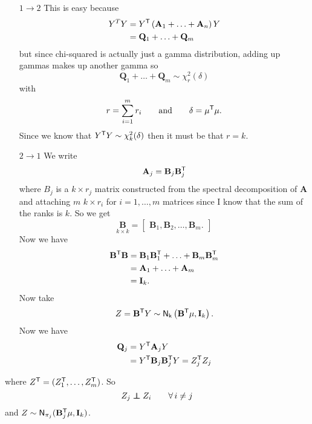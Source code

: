 \documentclass[12pt]{report}
\begin{document}
\begin{fancyproof}
	\begin{enumerate}
		\item[$1\to2$] This is easy because
		\begin{align*}
			Y^{T}Y&=Y^{\mathsf{T}}\left(\mathbf{A}_{1}+\ldots+\mathbf{A}_{n}\right)Y\\
			&=\mathbf{Q}_{1}+\ldots+\mathbf{Q}_{m}
		\end{align*} 
		but since chi-squared is actually just a gamma distribution, adding up gammas makes up another gamma so
		\begin{equation*}
			\mathbf{Q}_{1}+\ldots+\mathbf{Q}_{m}\sim\chi^{2}_{r}(\delta)
		\end{equation*}
		with 
		\begin{equation*}
			r=\sum_{i=1}^{m}r_{i}\qquad\text{and}\qquad\delta=\mu^{\mathsf{T}}\mu.
		\end{equation*}
		Since we know that $Y^{\mathsf{T}}Y\sim\chi^{2}_{k}(\delta)$ then it must be that $r=k$.
		\item[$2\to1$] We write
		\begin{equation*}
			\mathbf{A}_{j}=\mathbf{B}_{j}\mathbf{B}_{j}^{\mathsf{T}}
		\end{equation*}
		where $B_{j}$ is a $k\times r_{j}$ matrix constructed from the spectral decomposition of $\mathbf{A}$ and attaching $m$ $k\times r_{i}$ for $i=1,\ldots,m$ matrices since I know that the sum of the ranks is $k$. So we get
		\begin{equation*}
		\underset{k\times k}{\mathbf{B}}=\begin{bmatrix}
				\mathbf{B}_{1},\mathbf{B}_{2},\ldots,\mathbf{B}_{m}.
			\end{bmatrix}
		\end{equation*}
		Now we have
		\begin{align*}
			\mathbf{B^{\mathsf{T}}B}&=\mathbf{B}_{1}\mathbf{B}_{1}^{\mathsf{T}}+\ldots+\mathbf{B}_{m}\mathbf{B}_{m}^{\mathsf{T}}\\
			&=\mathbf{A}_{1}+\ldots+\mathbf{A}_{m}\\
			&=\mathbf{I}_{k}.
		\end{align*}
		Now take
		\begin{equation*}
			Z=\mathbf{B}^{\mathsf{T}}Y\sim\mathsf{N}_{\mathsf{k}}\left(\mathbf{B}^{\mathsf{T}}\mu,\mathbf{I}_{k}\right).
		\end{equation*}
		Now we have
		\begin{align*}
			\mathbf{Q}_{j}&=Y^{\mathsf{T}}\mathbf{A}_{j}Y\\
			&=Y^{\mathsf{T}}\mathbf{B}_{j}\mathbf{B}_{j}^{\mathsf{T}}Y=Z_{j}^{\mathsf{T}}Z_{j}
		\end{align*}
	\end{enumerate}
	where $Z^{\mathsf{T}}=(Z^{\mathsf{T}}_{1},\ldots,Z^{\mathsf{T}}_{m})$. So
	\begin{equation*}
		Z_{j}\indep Z_{i}\qquad\every i\neq j
	\end{equation*}
	and $Z\sim\mathsf{N}_{\pi_{j}}(\mathbf{B}^{\mathsf{T}}_{j}\mu,\mathbf{I}_{k})$.
\end{fancyproof}
\end{document}

